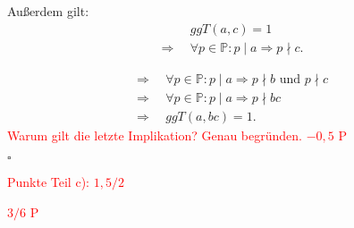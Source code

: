\documentclass[12pt]{article}
\newcommand{\corr}[1]{\textcolor{red}{#1}}
\newcommand{\QED}{\begin{flushright} $\square$ \end{flushright}}
\newcommand{\df}{\Longrightarrow \enspace}
\begin{document}
\begin{enumerate}
Außerdem gilt:
\begin{align*}
	&ggT(a, c) = 1 \\
	\df &\forall p \in \mathbb{P}: p \mid a \Rightarrow p \nmid c.
\end{align*}

\begin{align*}
	\df &\forall p \in \mathbb{P}: p \mid a \Rightarrow p \nmid b \text{ und } p \nmid c \\
	\df &\forall p \in \mathbb{P}: p \mid a \Rightarrow p \nmid b c \\
	\df &ggT(a, b c) = 1.
\end{align*}
\corr{Warum gilt die letzte Implikation? Genau begründen. $-0,5$ P}
\QED
\corr{Punkte Teil c): $1,5/2$}

\end{enumerate}

\noindent
\corr{$3/6$ P}
\end{document}
